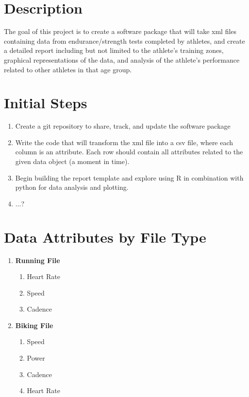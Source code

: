 \documentclass{article}
\begin{document}
\maketitle

\section{Description} The goal of this project is to create a software package that will take xml files containing data from endurance/strength tests completed by athletes, and create a detailed report including but not limited to the athlete's training zones, graphical representations of the data, and analysis of the athlete's performance related to other athletes in that age group.

\section{Initial Steps}
\begin{enumerate}
	\item Create a git repository to share, track, and update the software package
	\item Write the code that will transform the xml file into a csv file, where each column is an attribute. Each row should contain all attributes related to the given data object (a moment in time). 
	\item Begin building the report template and explore using R in combination with python for data analysis and plotting.
	\item ...?
\end{enumerate}
\section{Data Attributes by File Type} 
\begin{enumerate}
	\item[]\textbf{Running File}
	\begin{enumerate}
		\item Heart Rate
		\item Speed
		\item Cadence
	\end{enumerate}
	\item[]\textbf{Biking File}
	\begin{enumerate}
		\item Speed
		\item Power
		\item Cadence
		\item Heart Rate
	\end{enumerate}
\end{enumerate}
\end{document}
